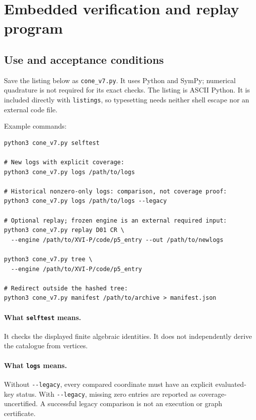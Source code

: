 \documentclass[11pt,a4paper]{article}
\newcommand{\loc}[1]{\nolinkurl{#1}}
\theoremstyle{plain}
\theoremstyle{definition}
\theoremstyle{remark}
\numberwithin{equation}{section}
\begin{document}
\appendix
\section{Embedded verification and replay program}
\label{app:code}

\subsection{Use and acceptance conditions}

Save the listing below as \loc{cone_v7.py}. It uses Python and
SymPy; numerical quadrature is not required for its exact checks.
The listing is ASCII Python. It is included directly with
\loc{listings}, so typesetting needs neither shell escape nor an
external code file.

Example commands:
\begin{verbatim}
python3 cone_v7.py selftest

# New logs with explicit coverage:
python3 cone_v7.py logs /path/to/logs

# Historical nonzero-only logs: comparison, not coverage proof:
python3 cone_v7.py logs /path/to/logs --legacy

# Optional replay; frozen engine is an external required input:
python3 cone_v7.py replay D01 CR \
  --engine /path/to/XVI-P/code/p5_entry --out /path/to/newlogs

python3 cone_v7.py tree \
  --engine /path/to/XVI-P/code/p5_entry

# Redirect outside the hashed tree:
python3 cone_v7.py manifest /path/to/archive > manifest.json
\end{verbatim}

\paragraph{What \loc{selftest} means.}
It checks the displayed finite algebraic identities. It does
not independently derive the catalogue from vertices.

\paragraph{What \loc{logs} means.}
Without \loc{--legacy}, every compared coordinate must have an
explicit evaluated-key status. With \loc{--legacy}, missing zero
entries are reported as coverage-uncertified. A successful legacy
comparison is not an execution or graph certificate.
\end{document}
